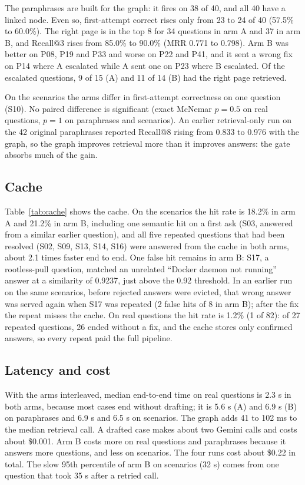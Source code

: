 \documentclass[cameraready]{ieeeconf}
\begin{document}
The paraphrases are built for the graph: it fires on 38 of 40, and all 40 have a linked node. Even so, first-attempt correct rises only from 23 to 24 of 40 (57.5\% to 60.0\%). The right page is in the top 8 for 34 questions in arm A and 37 in arm B, and Recall@3 rises from 85.0\% to 90.0\% (MRR 0.771 to 0.798). Arm B was better on P08, P19 and P33 and worse on P22 and P41, and it sent a wrong fix on P14 where A escalated while A sent one on P23 where B escalated. Of the escalated questions, 9 of 15 (A) and 11 of 14 (B) had the right page retrieved.

On the scenarios the arms differ in first-attempt correctness on one question (S10). No paired difference is significant (exact McNemar $p=0.5$ on real questions, $p=1$ on paraphrases and scenarios). An earlier retrieval-only run on the 42 original paraphrases reported Recall@8 rising from 0.833 to 0.976 with the graph, so the graph improves retrieval more than it improves answers: the gate absorbs much of the gain.

\subsection{Cache}

Table~\ref{tab:cache} shows the cache. On the scenarios the hit rate is 18.2\% in arm A and 21.2\% in arm B, including one semantic hit on a first ask (S03, answered from a similar earlier question), and all five repeated questions that had been resolved (S02, S09, S13, S14, S16) were answered from the cache in both arms, about 2.1 times faster end to end. One false hit remains in arm B: S17, a rootless-pull question, matched an unrelated ``Docker daemon not running'' answer at a similarity of 0.9237, just above the 0.92 threshold. In an earlier run on the same scenarios, before rejected answers were evicted, that wrong answer was served again when S17 was repeated (2 false hits of 8 in arm B); after the fix the repeat misses the cache. On real questions the hit rate is 1.2\% (1 of 82): of 27 repeated questions, 26 ended without a fix, and the cache stores only confirmed answers, so every repeat paid the full pipeline.

\subsection{Latency and cost}
With the arms interleaved, median end-to-end time on real questions is 2.3 s in both arms, because most cases end without drafting; it is 5.6 s (A) and 6.9 s (B) on paraphrases and 6.9 s and 6.5 s on scenarios. The graph adds 41 to 102 ms to the median retrieval call. A drafted case makes about two Gemini calls and costs about \$0.001. Arm B costs more on real questions and paraphrases because it answers more questions, and less on scenarios. The four runs cost about \$0.22 in total. The slow 95th percentile of arm B on scenarios (32 s) comes from one question that took 35 s after a retried call.
\end{document}

